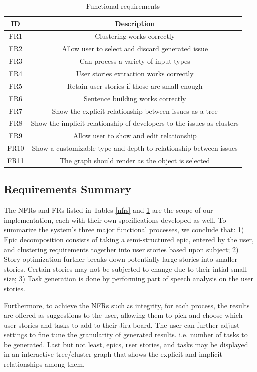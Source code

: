 \begin{table}
\centering
\caption{Functional requirements}
\label{frt}
\begin{tabular}{ |c|c| } 
\hline
\multicolumn{1}{|c|}{\textbf{ID}} & \multicolumn{1}{c|}{\textbf{Description}} \\
\hline
FR1 & Clustering works correctly \\
\hline
FR2 & Allow user to select and discard generated issue \\
\hline
FR3 & Can process a variety of input types \\
\hline
FR4 & User stories extraction works correctly \\
\hline
FR5 & Retain user stories if those are small enough \\
\hline
FR6 & Sentence building works correctly \\
\hline
FR7 & Show the explicit relationship between issues as a tree \\
\hline
FR8 & Show the implicit relationship of developers to the issues as clusters \\
\hline
FR9 & Allow user to show and edit relationship \\
\hline
FR10 & Show a customizable type and depth to relationship between issues \\
\hline
FR11 & The graph should render as the object is selected \\
\hline
\end{tabular}
\end{table}

\subsection{Requirements Summary}
The NFRs and FRs listed in Tables \ref{nfrs} and \ref{frt} are the scope of our implementation, each with their own specifications developed as well. To summarize the system's three major functional processes, we conclude that: 1) Epic decomposition consists of taking a semi-structured epic, entered by the user, and clustering requirements together into user stories based upon subject; 2) Story optimization further breaks down potentially large stories into smaller stories. Certain stories may not be subjected to change due to their intial small size; 3) Task generation is done by performing part of speech analysis on the user stories. 

Furthermore, to achieve the NFRs such as integrity, for each process, the results are offered as suggestions to the user, allowing them to pick and choose which user stories and tasks to add to their Jira board. The user can further adjust settings to fine tune the granularity of generated results. i.e. number of tasks to be generated. Last but not least, epics, user stories, and tasks may be displayed in an interactive tree/cluster graph that shows the explicit and implicit relationships among them.

